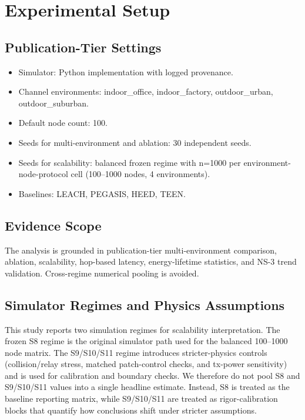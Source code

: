 \documentclass[sensors,article,submit,moreauthors,pdftex]{Definitions/mdpi}
\begin{document}
\section{Experimental Setup}
\subsection{Publication-Tier Settings}
\begin{itemize}
\item Simulator: Python implementation with logged provenance.
\item Channel environments: indoor\_office, indoor\_factory, outdoor\_urban, outdoor\_suburban.
\item Default node count: 100.
\item Seeds for multi-environment and ablation: 30 independent seeds.
\item Seeds for scalability: balanced frozen regime with n=1000 per environment-node-protocol cell (100--1000 nodes, 4 environments).
\item Baselines: LEACH, PEGASIS, HEED, TEEN.
\end{itemize}

\subsection{Evidence Scope}
The analysis is grounded in publication-tier multi-environment comparison, ablation, scalability, hop-based latency, energy-lifetime statistics, and NS-3 trend validation. Cross-regime numerical pooling is avoided.

\subsection{Simulator Regimes and Physics Assumptions}
This study reports two simulation regimes for scalability interpretation. The frozen S8 regime is the original simulator path used for the balanced 100--1000 node matrix. The S9/S10/S11 regime introduces stricter-physics controls (collision/relay stress, matched patch-control checks, and tx-power sensitivity) and is used for calibration and boundary checks. We therefore do not pool S8 and S9/S10/S11 values into a single headline estimate. Instead, S8 is treated as the baseline reporting matrix, while S9/S10/S11 are treated as rigor-calibration blocks that quantify how conclusions shift under stricter assumptions.
\end{document}

